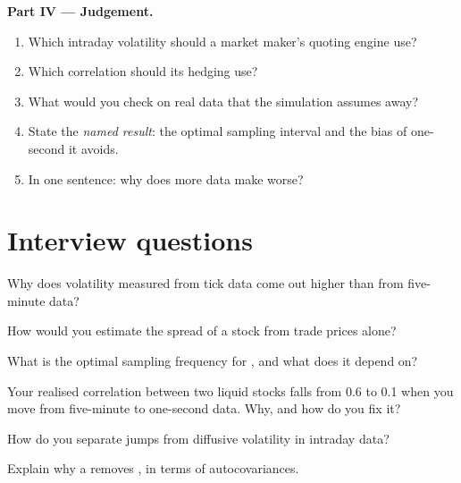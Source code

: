 \begin{problem}
\medskip\noindent\textbf{Part IV --- Judgement.}
\begin{enumerate}[resume]
\item Which intraday volatility should a market maker's quoting engine use?
\item Which correlation should its hedging use?
\item What would you check on real data that the simulation assumes away?
\item State the \emph{named result}: the optimal sampling interval and the bias of one-second  it avoids.
\item In one sentence: why does more data make  worse?
\end{enumerate}
\end{problem}

\section{Interview questions}

\begin{interviewq}\label{iq:qm:high-frequency-econometrics:1}
Why does volatility measured from tick data come out higher than from five-minute data?
\end{interviewq}

\begin{interviewq}\label{iq:qm:high-frequency-econometrics:2}
How would you estimate the spread of a stock from trade prices alone?
\end{interviewq}

\begin{interviewq}\label{iq:qm:high-frequency-econometrics:3}
What is the optimal sampling frequency for , and what does it depend on?
\end{interviewq}

\begin{interviewq}\label{iq:qm:high-frequency-econometrics:4}
Your realised correlation between two liquid stocks falls from 0.6 to 0.1 when you move from five-minute to one-second data. Why, and how do you fix it?
\end{interviewq}

\begin{interviewq}\label{iq:qm:high-frequency-econometrics:5}
How do you separate jumps from diffusive volatility in intraday data?
\end{interviewq}

\begin{interviewq}\label{iq:qm:high-frequency-econometrics:6}
Explain why a  removes , in terms of autocovariances.
\end{interviewq}
